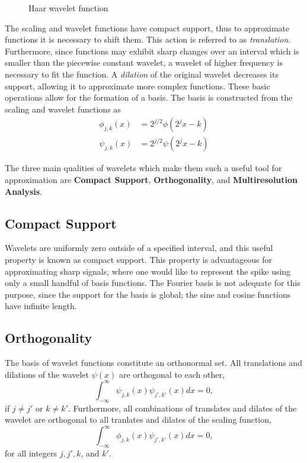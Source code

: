 \documentclass[11pt]{article}
\begin{document}
\begin{figure}[H]
	\centering
	
	\caption{Haar wavelet function}
	\label{fig:haar_wavelet}
\end{figure}
The scaling and wavelet functions have compact support, thus to approximate functions it is necessary to shift them. 
This action is referred to as \textit{translation}. Furthermore, since functions may exhibit sharp changes over an
interval which is smaller than the piecewise constant wavelet, a wavelet of higher frequency is necessary
to fit the function. A \textit{dilation} of the original wavelet decreases its support, allowing it to 
approximate more complex functions. These basic operations allow for the formation of a basis.
The basis is constructed from the scaling and wavelet functions as
\begin{align}
\phi_{j,k}(x) & = 2^{j/2} \phi(2^j x - k) \\
\psi_{j,k}(x) & = 2^{j/2} \psi(2^j x - k) 
\label{dilation equation}
\end{align}

The three main qualities of wavelets which make them such a useful tool for 
approximation are \textbf{Compact Support}, \textbf{Orthogonality}, and \textbf{Multiresolution Analysis}.
\subsection{Compact Support}
Wavelets are uniformly zero outside of a specified interval, and this useful property is known as compact support.
This property is advantageous for approximating sharp signals, where one would like to represent the spike using only a small 
handful of basis functions. The Fourier basis is not adequate for this purpose, since the support for the basis is global; 
the sine and cosine functions have infinite length. 
\subsection{Orthogonality}
The basis of wavelet functions constitute an orthonormal set. All translations and dilations of the 
wavelet $\psi(x)$ are orthogonal to each other,
\begin{equation}
\int_{-\infty}^{\infty} \psi_{j,k}(x) \psi_{j',k'}(x) dx = 0,
\end{equation}
if $j \neq j'$ or $k \neq k'$. Furthermore, all combinations of translates and dilates of the wavelet are orthogonal
to all tranlates and dilates of the scaling function,
\begin{equation}
\int_{-\infty}^{\infty} \phi_{j,k}(x) \psi_{j',k'}(x) dx = 0,
\end{equation}
for all integers $j,j',k$, and $k'$.
\end{document}
